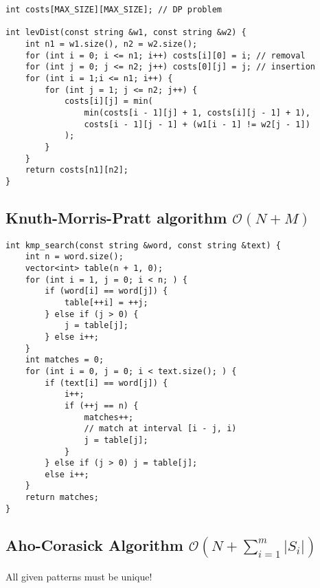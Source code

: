 \documentclass{article}
\begin{document}
\begin{lstlisting}
int costs[MAX_SIZE][MAX_SIZE]; // DP problem

int levDist(const string &w1, const string &w2) {
	int n1 = w1.size(), n2 = w2.size();
	for (int i = 0; i <= n1; i++) costs[i][0] = i; // removal
	for (int j = 0; j <= n2; j++) costs[0][j] = j; // insertion
	for (int i = 1;i <= n1; i++) {
		for (int j = 1; j <= n2; j++) {
			costs[i][j] = min(
				min(costs[i - 1][j] + 1, costs[i][j - 1] + 1),
				costs[i - 1][j - 1] + (w1[i - 1] != w2[j - 1])
			);
		}
	}
	return costs[n1][n2];
}
\end{lstlisting}

\subsection{Knuth-Morris-Pratt algorithm $\mathcal{O}(N + M)$}

\begin{lstlisting}
int kmp_search(const string &word, const string &text) {
	int n = word.size();
	vector<int> table(n + 1, 0);
	for (int i = 1, j = 0; i < n; ) {
		if (word[i] == word[j]) {
			table[++i] = ++j;
		} else if (j > 0) {
			j = table[j];
		} else i++;
	}
	int matches = 0;
	for (int i = 0, j = 0; i < text.size(); ) {
		if (text[i] == word[j]) {
			i++;
			if (++j == n) {
				matches++;
				// match at interval [i - j, i)
				j = table[j];
			}
		} else if (j > 0) j = table[j];
		else i++;
	}
	return matches;
}
\end{lstlisting}

\subsection{Aho-Corasick Algorithm $\mathcal{O}(N + \sum_{i=1}^{m} |S_i|)$}

All given patterns must be unique!
\end{document}
